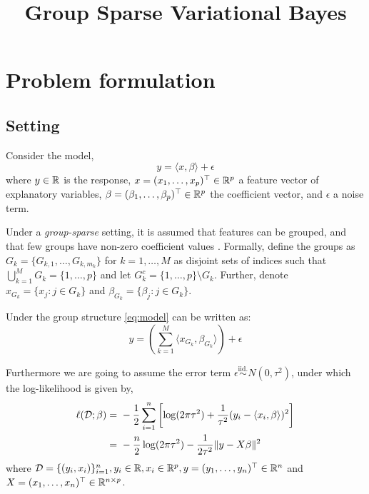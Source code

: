 \documentclass[12pt]{article}
\title{Group Sparse Variational Bayes}
\author{}
\date{}
\begin{document}
\maketitle


\section{Problem formulation}

\subsection{Setting}

Consider the model,
\begin{equation} \label{eq:model} 
    y = \langle x, \beta \rangle + \epsilon
\end{equation}
where $y \in \mathbb{R}$ is the response, $x = (x_1, \dots, x_p)^\top \in \mathbb{R}^p$ a feature vector of explanatory variables, $\beta = (\beta_1, \dots, \beta_p)^\top \in \mathbb{R}^p$ the coefficient vector, and $\epsilon$ a noise term. 

Under a \textit{group-sparse} setting, it is assumed that features can be grouped, and that few groups have non-zero coefficient values \citep{Giraud2021}.  Formally, define the groups as $G_k = \{ G_{k,1}, \dots, G_{k, m_k} \}$ for $k=1,\dots,M$ as disjoint sets of indices such that $ \bigcup_{k=1}^M G_k = \{1, \dots, p \}$ and let $G_k^c = \{1,\dots, p \} \setminus G_k$. Further, denote $x_{G_k} = \{x_j : j \in G_k \}$ and $\beta_{G_k} = \{\beta_j : j \in G_k \}$. 

Under the group structure \eqref{eq:model} can be written as:
\begin{equation}
    y = \left( \sum_{k=1}^{M} \langle x_{G_k}, \beta_{G_k} \rangle \right) + \epsilon
\end{equation}

Furthermore we are going to assume the error term $\epsilon \overset{\text{iid.}}{\sim} N(0, \tau^2)$, under which the log-likelihood is given by,
\begin{align}
    \ell(\mathcal{D}; \beta) = &\ -\frac{1}{2} \sum_{i=1}^n \left[ 
	\log(2\pi \tau^2) + \frac{1}{\tau^2} 
	(y_i - \langle x_i, \beta \rangle)^2
    \right] \nonumber \\
    =&\ - \frac{n}{2}\log(2\pi\tau^2) - \frac{1}{2\tau^2} \| y - X \beta \|^2 \label{eq:log-likelihood}
\end{align}
where $\mathcal{D} = \{ (y_i, x_i) \}_{i=1}^n, y_i \in \mathbb{R}, x_i \in \mathbb{R}^p,  y = (y_1, \dots, y_n)^\top \in \mathbb{R}^n$ and $X = (x_1, \dots, x_n)^\top \in \mathbb{R}^{n \times p}$.
\end{document}
